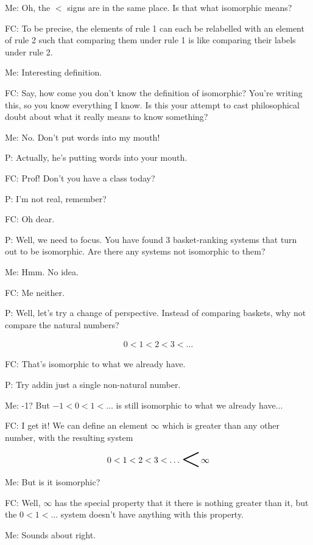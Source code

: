 \documentclass[a4paper,12pt]{article}
\begin{document}
Me: Oh, the $<$ signs are in the same place. Is that what isomorphic means?

FC: To be precise, the elements of rule 1 can each be relabelled with an element of rule 2 such that comparing them under rule 1 is like comparing their labels under rule 2.

Me: Interesting definition.

FC: Say, how come you don't know the definition of isomorphic? You're writing this, so you know everything I know. Is this your attempt to cast philosophical doubt about what it really means to know something?

Me: No. Don't put words into my mouth!

P: Actually, he's putting words into your mouth.

FC: Prof! Don't you have a class today?

P: I'm not real, remember?

FC: Oh dear.

P: Well, we need to focus. You have found 3 basket-ranking systems that turn out to be isomorphic. Are there any systems not isomorphic to them?

Me: Hmm. No idea.

FC: Me neither.

P: Well, let's try a change of perspective. Instead of comparing baskets, why not compare the natural numbers?

\begin{align*}
0 < 1 < 2 < 3 < \ldots
\end{align*}

FC: That's isomorphic to what we already have.

P: Try addin just a single non-natural number.

Me: -1? But $-1 < 0 < 1 < \ldots$ is still isomorphic to what we already have...

FC: I get it! We can define an element $\infty$ which is greater than any other number, with the resulting system

\begin{align*}
0 < 1 < 2 < 3 < \ldots \raisebox{-0.375em}{\scalebox{3}{$<$}} \infty
\end{align*}

Me: But is it isomorphic?

FC: Well, $\infty$ has the special property that it there is nothing greater than it, but the $0 < 1 < \ldots$ system doesn't have anything with this property.

Me: Sounds about right.
\end{document}
